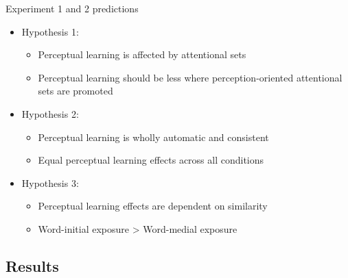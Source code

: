 \documentclass{beamer}
\begin{document}
\begin{frame}{Experiment 1 and 2 predictions}

\begin{itemize}
\item Hypothesis 1:
\begin{itemize}
\item Perceptual learning is affected by attentional sets
\item Perceptual learning should be less where perception-oriented attentional sets are promoted
\end{itemize}
\item Hypothesis 2:
\begin{itemize}
\item Perceptual learning is wholly automatic and consistent
\item Equal perceptual learning effects across all conditions
\end{itemize}
\item Hypothesis 3:
\begin{itemize}
\item Perceptual learning effects are dependent on similarity
\item Word-initial exposure > Word-medial exposure
\end{itemize}
\end{itemize}
\end{frame}

\subsection{Results}
\end{document}
